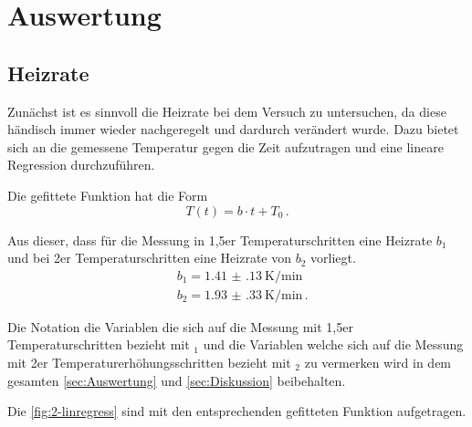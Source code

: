 \newpage
\section{Auswertung}
\label{sec:Auswertung}

\subsection{Heizrate}
Zunächst ist es sinnvoll die Heizrate bei dem Versuch zu untersuchen, da diese händisch immer wieder nachgeregelt und dardurch verändert wurde. Dazu bietet sich an 
die gemessene Temperatur gegen die Zeit aufzutragen und eine lineare Regression durchzuführen.

Die gefittete Funktion hat die Form
\begin{equation*}
  T(t) = b \cdot t + T_0 \, .
\end{equation*}

\noindent
Aus dieser, dass für die Messung in 1,5er Temperaturschritten eine Heizrate $b_1$ und bei 2er Temperaturschritten eine Heizrate von $b_2$ vorliegt. 
\begin{align*}
  &b_1 = \SI{1.41(13)}{\kelvin\per\minute} \\
  &b_2 = \SI{1.93(33)}{\kelvin\per\minute} \, .
\end{align*}

Die Notation die Variablen die sich auf die Messung mit 1,5er Temperaturschritten bezieht mit $_1$ und die Variablen welche sich auf die Messung mit 2er Temperaturerhöhungsschritten 
bezieht mit $_2$ zu vermerken wird in dem gesamten \autoref{sec:Auswertung} und \autoref{sec:Diskussion} beibehalten.

\noindent
Die \autoref{fig:2-linregress} sind mit den entsprechenden gefitteten Funktion aufgetragen.

